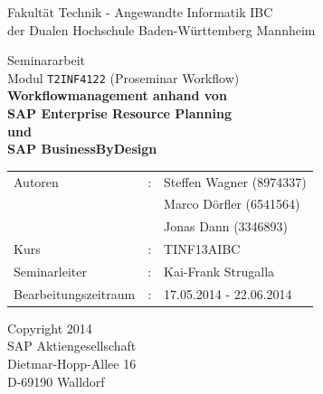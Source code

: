 \begin{center}

\vspace{0.5cm}
{\large Fakultät Technik - Angewandte Informatik IBC}\\
{\large der Dualen Hochschule Baden-Württemberg Mannheim}\\

\vspace{1.5cm}

{\Large Seminararbeit \\
				Modul \verb|T2INF4122| (Proseminar Workflow) 
}\\

\vspace{1.5cm}
{ \Large \textbf{
        Workflowmanagement anhand von \\ SAP Enterprise Resource Planning \\ und \\ SAP BusinessByDesign\\
				}
}

\vspace{1.5cm}

\begin{tabular}{lll}
Autoren	&:& Steffen Wagner (8974337) \\
&& Marco Dörfler (6541564) \\
&& Jonas Dann (3346893) \\
Kurs   &:& TINF13AIBC \\
Seminarleiter   &:& Kai-Frank Strugalla \\
Bearbeitungszeitraum   &:& 17.05.2014 - 22.06.2014 \\
\end{tabular}


\vspace{1.5cm}
Copyright 2014 \\
SAP Aktiengesellschaft \\
Dietmar-Hopp-Allee 16 \\
D-69190 Walldorf \\
\vspace{0.5cm}

\end{center}
\newpage
\thispagestyle{empty}
\mbox{}